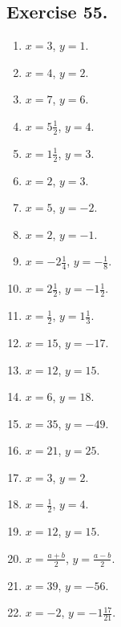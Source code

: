 \documentclass{book}
\begin{document}
\subsection*{Exercise 55.}

\begin{enumerate}
\item $x=3$, $y=1$.

\item $x=4$, $y=2$.

\item $x=7$, $y=6$.

\item $x=5\frac{1}{2}$, $y=4$.

\item $x=1\frac{1}{2}$, $y=3$.

\item $x=2$, $y=3$.

\item $x=5$, $y=-2$.

\item $x=2$, $y=-1$.

\item $x=-2\frac{1}{4}$, $y=-\frac{1}{8}$.

\item $x=2\frac{1}{2}$, $y=-1\frac{1}{2}$.

\item $x=\frac{1}{2}$, $y=1\frac{1}{3}$.

\item $x=15$, $y=-17$.

\item $x=12$, $y=15$.

\item $x=6$, $y=18$.

\item $x=35$, $y=-49$.

\item $x=21$, $y=25$.

\item $x=3$, $y=2$.

\item $x=\frac{1}{2}$, $y=4$.

\item $x=12$, $y=15$.

\item $x=\frac{a+b}{2}$, $y=\frac{a-b}{2}$.

\item $x=39$, $y=-56$.

\item $x=-2$, $y=-1\frac{17}{21}$.


\end{enumerate}
\end{document}
